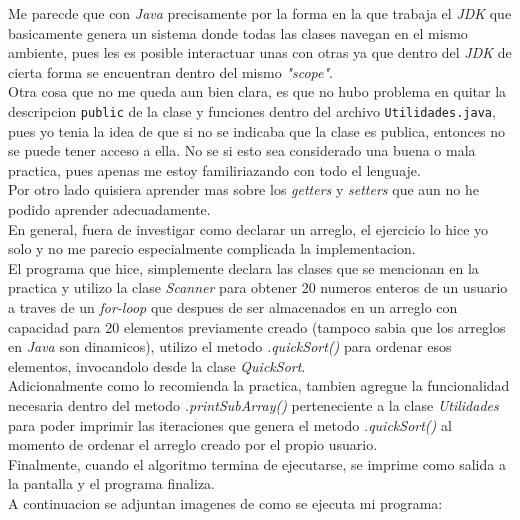 \documentclass{article}
\begin{document}
		Me parecde que con \emph{Java} precisamente por la forma en la que trabaja el \emph{JDK} que basicamente genera un sistema donde todas las clases navegan en el mismo ambiente, pues les es posible interactuar unas con otras ya que dentro del \emph{JDK} de cierta forma se encuentran dentro del mismo \emph{"scope"}.\\
		
		Otra cosa que no me queda aun bien clara, es que no hubo problema en quitar la descripcion \verb*|public| de la clase y funciones dentro del archivo \verb*|Utilidades.java|, pues yo tenia la idea de que si no se indicaba que la clase es publica, entonces no se puede tener acceso a ella. No se si esto sea considerado una buena o mala practica, pues apenas me estoy familiriazando con todo el lenguaje.\\
		
		Por otro lado quisiera aprender mas sobre los \emph{getters} y \emph{setters} que aun no he podido aprender adecuadamente.\\
		
		En general, fuera de investigar como declarar un arreglo, el ejercicio lo hice yo solo y no me parecio especialmente complicada la implementacion.\\
		
		El programa que hice, simplemente declara las clases que se mencionan en la practica y utilizo la clase \emph{Scanner} para obtener 20 numeros enteros de un usuario a traves de un \emph{for-loop} que despues de ser almacenados en un arreglo con capacidad para 20 elementos previamente creado (tampoco sabia que los arreglos en \emph{Java} son dinamicos), utilizo el metodo \emph{.quickSort()} para ordenar esos elementos, invocandolo desde la clase \emph{QuickSort}.\\
		
		Adicionalmente como lo recomienda la practica, tambien agregue la funcionalidad necesaria dentro del metodo \emph{.printSubArray()} perteneciente a la clase \emph{Utilidades} para poder imprimir las iteraciones que genera el metodo \emph{.quickSort()} al momento de ordenar el arreglo creado por el propio usuario.\\
		
		Finalmente, cuando el algoritmo termina de ejecutarse, se imprime como salida a la pantalla y el programa finaliza.\\
		
		A continuacion se adjuntan imagenes de como se ejecuta mi programa:
		
\end{document}
